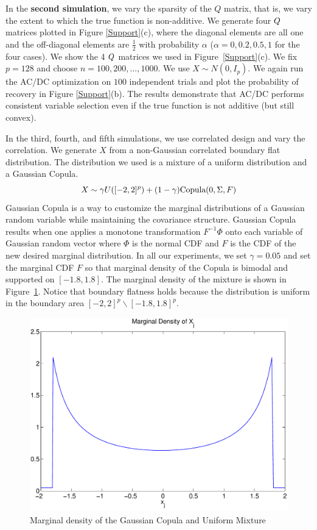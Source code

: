 In the \textbf{second simulation}, we vary the sparsity of the $Q$ matrix, that is, we vary the extent to which the true function is non-additive. We generate four $Q$ matrices
plotted in Figure \ref{Support}(c), where the diagonal elements are all one and
the off-diagonal elements are $\frac{1}{2}$ with probability $\alpha$
($\alpha=0,0.2,0.5,1$ for the four cases). We show the 4 $Q$ matrices we used in Figure~\ref{Support}(c).
We fix $p=128$ and choose
$n=100,200,\ldots,1000$. We use $X \sim N(0,I_p)$. We again run the AC/DC optimization on $100$
independent trials and plot the probability of recovery
in Figure \ref{Support}(b). The results demonstrate that AC/DC performs
consistent variable selection even if the true function is not additive (but
still convex).

In the third, fourth, and fifth simulations, we use correlated design and vary the correlation. We generate $X$ from a non-Gaussian correlated boundary flat distribution. The distribution we used is a mixture of a uniform distribution and a Gaussian Copula.
\[
X \sim \gamma U([-2, 2]^p) + (1-\gamma) \textrm{Copula}(0, \Sigma, F)
\]
Gaussian Copula is a way to customize the marginal distributions of a Gaussian random variable while maintaining the covariance structure. Gaussian Copula results when one applies a monotone transformation $F^{-1} \Phi$ onto each variable of Gaussian random vector where $\Phi$ is the normal CDF and $F$ is the CDF of the new desired marginal distribution. In all our experiments, we set $\gamma = 0.05$ and set the marginal CDF $F$ so that marginal density of the Copula is bimodal and supported on $[-1.8, 1.8]$. The marginal density of the mixture is shown in Figure~\ref{fig:copula_marginal}. Notice that boundary flatness holds because the distribution is uniform in the boundary area $[-2,2]^p \backslash [-1.8, 1.8]^p$.

\begin{figure}
\includegraphics[width=.4\textwidth]{figs/copula_marginal}
\caption{Marginal density of the Gaussian Copula and Uniform Mixture}
\label{fig:copula_marginal}
\end{figure}

